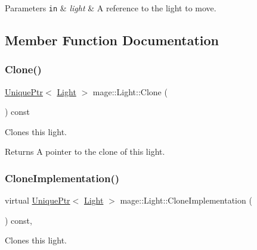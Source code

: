 \begin{DoxyParams}[1]{Parameters}
\mbox{\tt in}  & {\em light} & A reference to the light to move. \\
\hline
\end{DoxyParams}


\subsection{Member Function Documentation}
\hypertarget{classmage_1_1_light_a4c87e4a361b20519c49b4a0397625a6a}{}\label{classmage_1_1_light_a4c87e4a361b20519c49b4a0397625a6a} 
\subsubsection{\texorpdfstring{Clone()}{Clone()}}
{\footnotesize\ttfamily \hyperlink{namespacemage_a8c307fbcc33bce9b7f2aa4c26c3b95cf}{Unique\+Ptr}$<$ \hyperlink{classmage_1_1_light}{Light} $>$ mage\+::\+Light\+::\+Clone (\begin{DoxyParamCaption}{ }\end{DoxyParamCaption}) const}

Clones this light.

\begin{DoxyReturn}{Returns}
A pointer to the clone of this light. 
\end{DoxyReturn}
\hypertarget{classmage_1_1_light_aa613d76a1ebda69efde853d15f75490c}{}\label{classmage_1_1_light_aa613d76a1ebda69efde853d15f75490c} 
\subsubsection{\texorpdfstring{Clone\+Implementation()}{CloneImplementation()}}
{\footnotesize\ttfamily virtual \hyperlink{namespacemage_a8c307fbcc33bce9b7f2aa4c26c3b95cf}{Unique\+Ptr}$<$ \hyperlink{classmage_1_1_light}{Light} $>$ mage\+::\+Light\+::\+Clone\+Implementation (\begin{DoxyParamCaption}{ }\end{DoxyParamCaption}) const\hspace{0.3cm}{\ttfamily [private]}, {}}

Clones this light.

